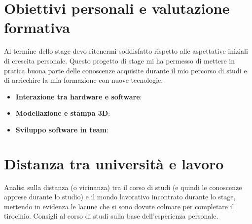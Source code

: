 \section{Obiettivi personali e valutazione formativa}
Al termine dello stage devo ritenermi soddisfatto rispetto alle aspettative iniziali di crescita personale. Questo progetto di stage mi ha permesso di mettere in pratica buona parte delle conoscenze acquisite durante il mio percorso di studi e di arricchire la mia formazione con nuove tecnologie.

\begin{itemize}
\item \textbf{Interazione tra hardware e software}: 
\item \textbf{Modellazione e stampa 3D}:
\item \textbf{Sviluppo software in team}:
\end{itemize}

\section{Distanza tra università e lavoro}
Analisi sulla distanza (o vicinanza) tra il corso di studi (e quindi le conoscenze apprese durante lo studio) e il mondo lavorativo incontrato durante lo stage, mettendo in evidenza le lacune che si sono dovute colmare per completare il tirocinio.
Consigli al corso di studi sulla base dell'esperienza personale.